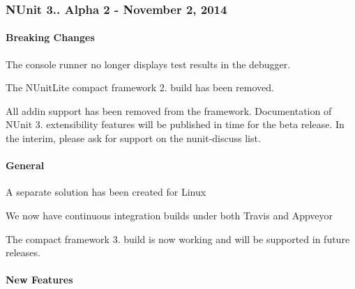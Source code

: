 \subsubsection*{N\+Unit 3.. Alpha 2 -\/ November 2, 2014}

\paragraph*{Breaking Changes}


\begin{DoxyItemize}
\item The console runner no longer displays test results in the debugger.
\item The N\+Unit\+Lite compact framework 2. build has been removed.
\item All addin support has been removed from the framework. Documentation of N\+Unit 3. extensibility features will be published in time for the beta release. In the interim, please ask for support on the nunit-\/discuss list.
\end{DoxyItemize}

\paragraph*{General}


\begin{DoxyItemize}
\item A separate solution has been created for Linux
\item We now have continuous integration builds under both Travis and Appveyor
\item The compact framework 3. build is now working and will be supported in future releases.
\end{DoxyItemize}

\paragraph*{New Features}


